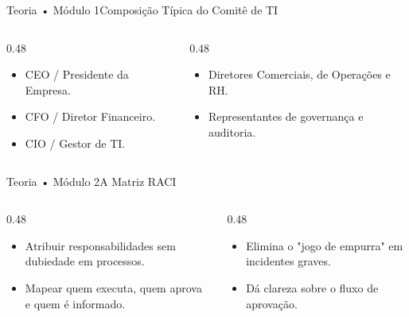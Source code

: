 \begin{senaiframe}{Teoria • Módulo 1}{Composição Típica do Comitê de TI}
  \begin{columns}[t]
    \begin{column}{0.48\textwidth}
      \begin{tcolorbox}[senaibluecard, title={Membros Obrigatórios}]
        \begin{itemize}
          \item CEO / Presidente da Empresa.
          \item CFO / Diretor Financeiro.
          \item CIO / Gestor de TI.
        \end{itemize}
      \end{tcolorbox}
    \end{column}
    \begin{column}{0.48\textwidth}
      \begin{tcolorbox}[senaiambercard, title={Membros de Negócio}]
        \begin{itemize}
          \item Diretores Comerciais, de Operações e RH.
          \item Representantes de governança e auditoria.
        \end{itemize}
      \end{tcolorbox}
    \end{column}
  \end{columns}
\end{senaiframe}

\begin{senaiframe}{Teoria • Módulo 2}{A Matriz RACI}
  \begin{columns}[t]
    \begin{column}{0.48\textwidth}
      \begin{tcolorbox}[senaibluecard, title={Finalidade}]
        \begin{itemize}
          \item Atribuir responsabilidades sem dubiedade em processos.
          \item Mapear quem executa, quem aprova e quem é informado.
        \end{itemize}
      \end{tcolorbox}
    \end{column}
    \begin{column}{0.48\textwidth}
      \begin{tcolorbox}[senaicard, title={Benefícios}]
        \begin{itemize}
          \item Elimina o "jogo de empurra" em incidentes graves.
          \item Dá clareza sobre o fluxo de aprovação.
        \end{itemize}
      \end{tcolorbox}
    \end{column}
  \end{columns}
\end{senaiframe}

